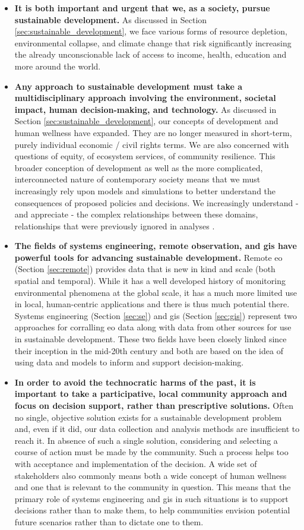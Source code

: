 \begin{itemize}[itemsep=0pt,parsep=0pt]
	\item{\textbf{It is both important and urgent that we, as a society, pursue sustainable development.} As discussed in Section \ref{sec:sustainable_development}, we face various forms of resource depletion, environmental collapse, and climate change that risk significantly increasing the already unconscionable lack of access to income, health, education and more around the world.}
	\item{\textbf{Any approach to sustainable development must take a multidisciplinary approach involving the environment, societal impact, human decision-making, and technology.} As discussed in Section \ref{sec:sustainable_development}, our concepts of development and human wellness have expanded. They are no longer measured in short-term, purely individual economic / civil rights terms. We are also concerned with questions of equity, of ecosystem services, of community resilience. This broader conception of development as well as the more complicated, interconnected nature of contemporary society means that we must increasingly rely upon models and simulations to better understand the consequences of proposed policies and decisions. We increasingly understand - and appreciate - the complex relationships between these domains, relationships that were previously ignored in analyses \cite{gaheganMultivariateGeovisualization2007}. }
	\item{\textbf{The fields of systems engineering, remote observation, and \ac{gis}  have powerful tools for advancing sustainable development.}  Remote \ac{eo} (Section \ref{sec:remote}) provides data that is new in kind and scale (both spatial and temporal). While it has a well developed history of monitoring environmental phenomena at the global scale, it has a much more limited use in local, human-centric applications and there is thus much potential there. Systems engineering (Section \ref{sec:se}) and \ac{gis} (Section \ref{sec:gis}) represent two approaches for corralling \ac{eo} data along with data from other sources for use in sustainable development. These two fields have been closely linked since their inception in the mid-20th century and both are based on the idea of using data and models to inform and support decision-making. }
	\item{\textbf{In order to avoid the technocratic harms of the past, it is important to take a participative, local community approach and focus on decision support, rather than prescriptive solutions.} Often no single, objective solution exists for a sustainable development problem and, even if it did, our data collection and analysis methods are insufficient to reach it. In absence of such a single solution, considering and selecting a course of action must be made by the community. Such a process helps too with acceptance and implementation of the decision. A wide set of stakeholders also commonly means both a wide concept of human wellness and one that is relevant to the community in question. This means that the primary role of systems engineering and \ac{gis} in such situations is to support decisions rather than to make them, to help communities envision potential future scenarios rather than to dictate one to them.}

\end{itemize}
